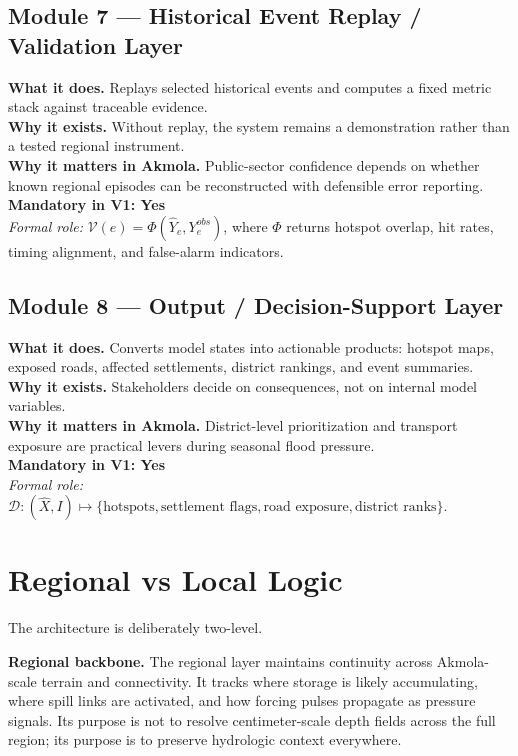\documentclass[11pt,a4paper]{article}
\newcommand{\modulerole}[1]{\textit{Formal role:} #1}
\newcommand{\vone}{\textbf{Mandatory in V1: Yes}}
\begin{document}
\subsection{Module 7 --- Historical Event Replay / Validation Layer}
\textbf{What it does.} Replays selected historical events and computes a fixed metric stack against traceable evidence.\\
\textbf{Why it exists.} Without replay, the system remains a demonstration rather than a tested regional instrument.\\
\textbf{Why it matters in Akmola.} Public-sector confidence depends on whether known regional episodes can be reconstructed with defensible error reporting.\\
\vone\\
\modulerole{$\mathcal{V}(e)=\Phi(\hat{Y}_e,Y_e^{obs})$, where $\Phi$ returns hotspot overlap, hit rates, timing alignment, and false-alarm indicators.}

\subsection{Module 8 --- Output / Decision-Support Layer}
\textbf{What it does.} Converts model states into actionable products: hotspot maps, exposed roads, affected settlements, district rankings, and event summaries.\\
\textbf{Why it exists.} Stakeholders decide on consequences, not on internal model variables.\\
\textbf{Why it matters in Akmola.} District-level prioritization and transport exposure are practical levers during seasonal flood pressure.\\
\vone\\
\modulerole{$\mathcal{D}:(\hat{X},I)\mapsto \{\text{hotspots},\text{settlement flags},\text{road exposure},\text{district ranks}\}$.}

\section{Regional vs Local Logic}

The architecture is deliberately two-level.

\textbf{Regional backbone.} The regional layer maintains continuity across Akmola-scale terrain and connectivity. It tracks where storage is likely accumulating, where spill links are activated, and how forcing pulses propagate as pressure signals. Its purpose is not to resolve centimeter-scale depth fields across the full region; its purpose is to preserve hydrologic context everywhere.
\end{document}

